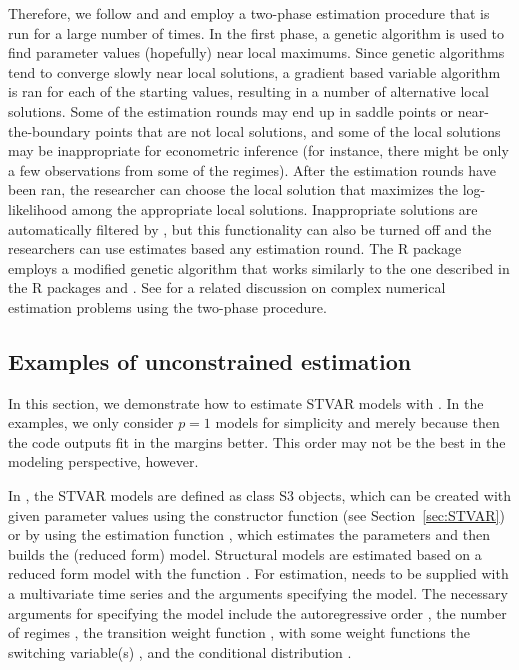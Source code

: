 \documentclass[nojss]{jss}
\begin{document}
Therefore, we follow \cite{Meitz+Preve+Saikkonen:2023} and \cite{Virolainen:2022} and employ a two-phase estimation procedure that is run for a large number of times. In the first phase, a genetic algorithm is used to find parameter values (hopefully) near local maximums. Since genetic algorithms tend to converge slowly near local solutions, a gradient based variable algorithm \cite[algorithm 21, implemented by \citealp{R}]{Nash:1990} is ran for each of the starting values, resulting in a number of alternative local solutions. Some of the estimation rounds may end up in saddle points or near-the-boundary points that are not local solutions, and some of the local solutions may be  inappropriate for econometric inference (for instance, there might be only a few observations from some of the regimes). After the estimation rounds have been ran, the researcher can choose the local solution that maximizes the log-likelihood among the appropriate local solutions. Inappropriate solutions are automatically filtered by , but this functionality can also be turned off and the researchers can use estimates based any estimation round. The R package  employs a modified genetic algorithm that works similarly to the one described in the R packages  \citep{uGMAR} and  \citep{gmvarkit} \citep[the genetic algorithm and implemented in former is briefly described in][]{Virolainen:2022}. See \citet[Chapter~3]{Virolainen2:2022} for a related discussion on complex numerical estimation problems using the two-phase procedure.

\subsection{Examples of unconstrained estimation}\label{sec:example_estim}
In this section, we demonstrate how to estimate STVAR models with . In the examples, we only consider $p=1$ models for simplicity and merely because then the code outputs fit in the margins better. This order may not be the best in the modeling perspective, however.

In , the STVAR models are defined as class  S3 objects, which can be created with given parameter values using the constructor function  (see Section~\ref{sec:STVAR}) or by using the estimation function , which estimates the parameters and then builds the (reduced form) model. Structural models are estimated based on a reduced form model with the function . For estimation,  needs to be supplied with a multivariate time series and the arguments specifying the model. The necessary arguments for specifying the model include the autoregressive order , the number of regimes , the transition weight function , with some weight functions the switching variable(s) , and the conditional distribution .
\end{document}
